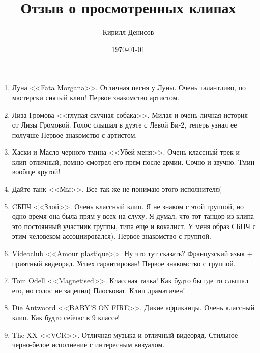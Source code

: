 \documentclass[a4paper,14pt]{extarticle}
\author{Кирилл Денисов}
\title{Отзыв о просмотренных клипах}
\date{\today}
\begin{document}
	
	\maketitle
	\thispagestyle{empty}

\begin{enumerate}
	\item Луна <<Fata Morgana>>. Отличная песня у Луны. Очень талантливо, по мастерски снятый клип! Первое знакомство артистом.
	\item Лиза Громова <<глупая скучная собака>>. Милая и очень личная история от Лизы Громовой. Голос слышал в дуэте с Левой Би-2, теперь узнал ее получше Первое знакомство с артистом. 
	\item Хаски и Масло черного тмина <<Убей меня>>. Очень классный трек и клип отличный, помню смотрел его прям после армии. Сочно и звучно. Тмин вообще крутой!
	\item Дайте танк <<Мы>>. Все так же не понимаю этого исполнителя(
	\item CБПЧ <<Злой>>. Очень классный клип. Я не знаком с этой группой, но одно время она была прям у всех на слуху. Я думал, что тот танцор из клипа это постоянный участник группы, типа еще и вокалист. У меня образ СБПЧ с этим человеком ассоциировался). Первое знакомство с группой.
	\item Videoclub <<Amour plastique>>. Ну что тут сказать? Французский язык + приятный видеоряд. Успех гарантирован! Первое знакомство с группой.
	\item Tom Odell <<Magnetised>>. Классная тачка! Как будто бы где то слышал его, но голос не зацепил( Плосковат. Клип драматичен!
	\item Die Antwoord <<BABY'S ON FIRE>>. Дикие африканцы. Очень классный клип. Как будто сейчас в 9 классе!
	\item The XX <<VCR>>. Отличная музыка и отличный видеоряд. Стильное черно-белое исполнение с интересным визуалом.
\end{enumerate} 
\end{document}
